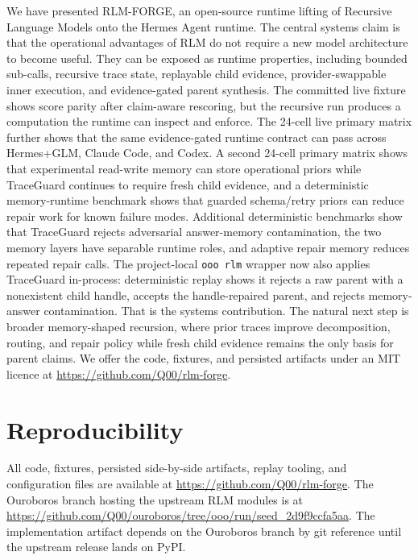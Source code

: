 \documentclass[11pt,a4paper]{article}
\begin{document}
We have presented RLM-FORGE, an open-source runtime lifting of Recursive
Language Models onto the Hermes Agent runtime. The central systems claim is
that the operational advantages of RLM do not require a new model architecture
to become useful. They can be exposed as runtime properties, including bounded
sub-calls, recursive trace state, replayable child evidence,
provider-swappable inner execution, and evidence-gated parent synthesis. The
committed live fixture shows score parity after claim-aware
rescoring, but the recursive run produces a computation the runtime can
inspect and enforce. The 24-cell live primary matrix further shows that the
same evidence-gated runtime contract can pass across Hermes+GLM, Claude Code,
and Codex. A second 24-cell primary matrix shows that experimental read-write
memory can store operational priors while TraceGuard continues to require
fresh child evidence, and a deterministic memory-runtime benchmark shows that
guarded schema/retry priors can reduce repair work for known failure modes.
Additional deterministic benchmarks show that TraceGuard rejects adversarial
answer-memory contamination, the two memory layers have separable runtime
roles, and adaptive repair memory reduces repeated repair calls. The
project-local \texttt{ooo rlm} wrapper now also applies TraceGuard in-process:
deterministic replay shows it rejects a raw parent with a nonexistent child
handle, accepts the handle-repaired parent, and rejects memory-answer
contamination.
That is the systems contribution. The natural next step is broader
memory-shaped recursion, where prior traces improve decomposition, routing,
and repair policy while fresh child evidence remains the only basis for parent
claims. We offer the code,
fixtures, and persisted artifacts under an MIT licence at
\url{https://github.com/Q00/rlm-forge}.

\section*{Reproducibility}

All code, fixtures, persisted side-by-side artifacts, replay tooling,
and configuration files are available at
\url{https://github.com/Q00/rlm-forge}. The Ouroboros branch
hosting the upstream RLM modules is at
\url{https://github.com/Q00/ouroboros/tree/ooo/run/seed_2d9f9ccfa5aa}.
The implementation artifact depends on the Ouroboros branch by git
reference until the upstream release lands on PyPI.



\end{document}

